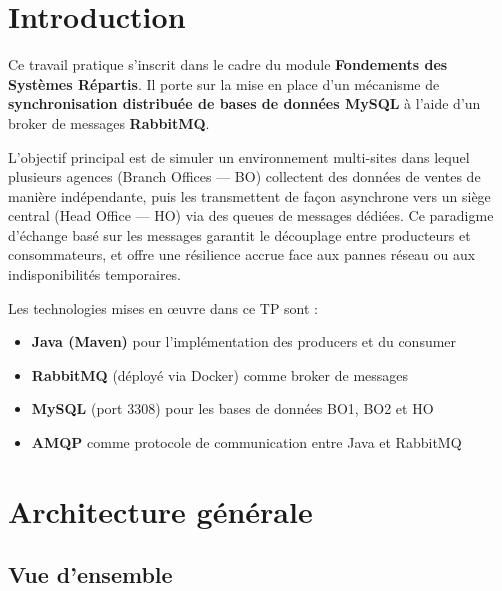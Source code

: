 \documentclass[a4paper,12pt]{article}
\begin{document}
\tableofcontents
\newpage

\section{Introduction}

Ce travail pratique s'inscrit dans le cadre du module \textbf{Fondements des Systèmes Répartis}. Il porte sur la mise en place d'un mécanisme de \textbf{synchronisation distribuée de bases de données MySQL} à l'aide d'un broker de messages \textbf{RabbitMQ}.

L'objectif principal est de simuler un environnement multi-sites dans lequel plusieurs agences (Branch Offices — BO) collectent des données de ventes de manière indépendante, puis les transmettent de façon asynchrone vers un siège central (Head Office — HO) via des queues de messages dédiées. Ce paradigme d'échange basé sur les messages garantit le découplage entre producteurs et consommateurs, et offre une résilience accrue face aux pannes réseau ou aux indisponibilités temporaires.

\bigskip

Les technologies mises en \oe uvre dans ce TP sont :

\begin{itemize}
    \item \textbf{Java (Maven)} pour l'implémentation des producers et du consumer
    \item \textbf{RabbitMQ} (déployé via Docker) comme broker de messages
    \item \textbf{MySQL} (port 3308) pour les bases de données BO1, BO2 et HO
    \item \textbf{AMQP} comme protocole de communication entre Java et RabbitMQ
\end{itemize}

\section{Architecture générale}

\subsection{Vue d'ensemble}
\end{document}

